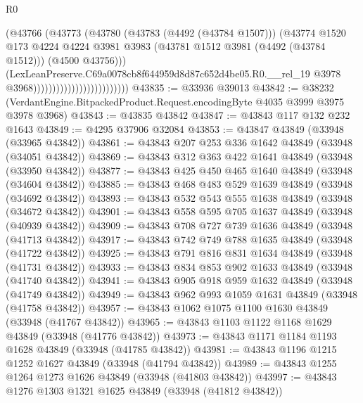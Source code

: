 \begin{lexlean}{R0}
\begin{coremodule}
                                                (@43766
                                                  (@43773
                                                    (@43780
                                                      (@43783 (@4492 (@43784 @1507)))
                                                      (@43774
                                                        @1520
                                                        @173
                                                        @4224
                                                        @4224
                                                        @3981
                                                        @3983
                                                        (@43781 @1512 @3981 (@4492 (@43784 @1512)))
                                                        (@4500 @43756)))
                                                    (LexLeanPreserve.C69a0078cb8f644959d8d87c652d4be05.R0.__rel_19
                                                      @3978
                                                      @3968)))))))))))))))))))))))))
@43835 := @33936 @39013
@43842 := @38232 (VerdantEngine.BitpackedProduct.Request.encodingByte @4035 @3999 @3975 @3978 @3968)
@43843 := @43835 @43842
@43847 := @43843 @117 @132 @232 @1643
@43849 := @4295 @37906 @32084
@43853 := @43847 @43849 (@33948 (@33965 @43842))
@43861 := @43843 @207 @253 @336 @1642 @43849 (@33948 (@34051 @43842))
@43869 := @43843 @312 @363 @422 @1641 @43849 (@33948 (@33950 @43842))
@43877 := @43843 @425 @450 @465 @1640 @43849 (@33948 (@34604 @43842))
@43885 := @43843 @468 @483 @529 @1639 @43849 (@33948 (@34692 @43842))
@43893 := @43843 @532 @543 @555 @1638 @43849 (@33948 (@34672 @43842))
@43901 := @43843 @558 @595 @705 @1637 @43849 (@33948 (@40939 @43842))
@43909 := @43843 @708 @727 @739 @1636 @43849 (@33948 (@41713 @43842))
@43917 := @43843 @742 @749 @788 @1635 @43849 (@33948 (@41722 @43842))
@43925 := @43843 @791 @816 @831 @1634 @43849 (@33948 (@41731 @43842))
@43933 := @43843 @834 @853 @902 @1633 @43849 (@33948 (@41740 @43842))
@43941 := @43843 @905 @918 @959 @1632 @43849 (@33948 (@41749 @43842))
@43949 := @43843 @962 @993 @1059 @1631 @43849 (@33948 (@41758 @43842))
@43957 := @43843 @1062 @1075 @1100 @1630 @43849 (@33948 (@41767 @43842))
@43965 := @43843 @1103 @1122 @1168 @1629 @43849 (@33948 (@41776 @43842))
@43973 := @43843 @1171 @1184 @1193 @1628 @43849 (@33948 (@41785 @43842))
@43981 := @43843 @1196 @1215 @1252 @1627 @43849 (@33948 (@41794 @43842))
@43989 := @43843 @1255 @1264 @1273 @1626 @43849 (@33948 (@41803 @43842))
@43997 := @43843 @1276 @1303 @1321 @1625 @43849 (@33948 (@41812 @43842))

\end{coremodule}
\end{lexlean}
